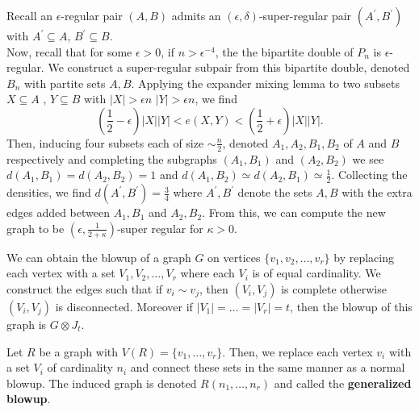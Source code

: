 Recall an \(\epsilon\)-regular pair \(\left( A, B \right) \) admits an \(\left( \epsilon, \delta \right) \)-super-regular pair \(\left( A^{\prime}, B^{\prime} \right) \) with \(A ^{\prime} \subseteq A\), \(B^{\prime} \subseteq B\). \\
Now, recall that for some \(\epsilon > 0\), if \(n > \epsilon^{-4}\), the the bipartite double of \(P_{n}\) is \(\epsilon\)-regular. We construct a super-regular subpair from this bipartite double, denoted \(B_{n}\) with partite sets \(A, B\). Applying the expander mixing lemma to two subsets \(X \subseteq A\) , \(Y \subseteq B\)  with \(\left| X \right| > \epsilon n\) \(\left| Y \right| > \epsilon n\), we find \[
	\left( \frac{1}{2}- \epsilon \right) \left| X \right| \left| Y \right| < e\left( X, Y \right)  < \left( \frac{1}{2}+ \epsilon \right) \left| X \right| \left| Y \right|
.\] Then, inducing four subsets each of size \(\sim \frac{n}{2}\), denoted \(A_1, A_2, B_1, B_2\) of \(A\) and \(B\) respectively and completing the subgraphs \(\left( A_1, B_1 \right) \) and \(\left( A_2, B_2 \right) \) we see \(d\left( A_1, B_1 \right) = d\left( A_2, B_2 \right) = 1\) and \(d\left( A_1, B_2 \right) \simeq d\left( A_2, B_1 \right) \simeq \frac{1}{2}\). Collecting the densities, we find \(d\left( A^{\prime}, B^{\prime} \right) = \frac{3}{4}\) where \(A^{\prime}, B^{\prime}\) denote the sets \(A, B\) with the extra edges added between \(A_1, B_1\) and \(A_2, B_2\). From this, we can compute the new graph to be \(\left( \epsilon, \frac{1}{2+ \kappa} \right) \)-super regular for \(\kappa > 0\).
\begin{recall}
	We can obtain the blowup of a graph \(G\)  on vertices \(\{v_1, v_2, \ldots, v_{r}\} \) by replacing each vertex with a set \(V_1, V_2, \ldots, V_{r}\) where each \(V_{i}\) is of equal cardinality. We construct the edges such that if \(v_{i} \sim v_{j}\), then \(\left( V_{i}, V_{j} \right) \) is complete otherwise \(\left( V_{i}, V_{j} \right) \) is disconnected. Moreover if \(\left| V_1 \right|  = \ldots = \left| V_{r} \right| = t\), then the blowup of this graph is \(G \otimes J_{t}\).
\end{recall}
\begin{definition}
	Let \(R\) be a graph with \(V\left( R \right) = \{v_1, \ldots, v_{r}\} \). Then, we replace each vertex \(v_{i}\) with a set \(V_{i}\) of cardinality \(n_{i}\) and connect these sets in the same manner as a normal blowup. The induced graph is denoted \(R\left( n_1, \ldots, n_{r} \right) \) and called the \textbf{generalized blowup}.
\end{definition}
